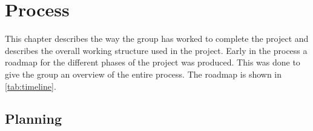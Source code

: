 
\chapter{Process}
This chapter describes the way the group has worked to complete the project and describes the overall working structure used in the project.
Early in the process a roadmap for the different phases of the project was produced. This was done to give the group an overview of the entire process. The roadmap is shown in \cref{tab:timeline}.

\section{Planning}
